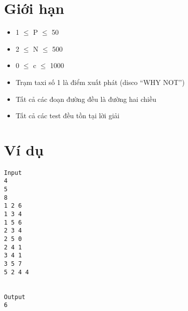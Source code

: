 \section{   Giới hạn  }
\begin{itemize}
	\item     1  $\le$  P  $\le$  50   
	\item     2  $\le$  N  $\le$  500   
	\item     0  $\le$  c  $\le$  1000   
	\item     Trạm taxi số 1 là điểm xuất phát (disco “WHY NOT”)   
	\item     Tất cả các đoạn đường đều là đường hai chiều   
	\item     Tất cả các test đều tồn tại lời giải   
\end{itemize}

\section{   Ví dụ  }
\begin{verbatim}
Input
4
5
8
1 2 6
1 3 4
1 5 6
2 3 4
2 5 0
2 4 1
3 4 1
3 5 7
5 2 4 4


Output
6
\end{verbatim}

